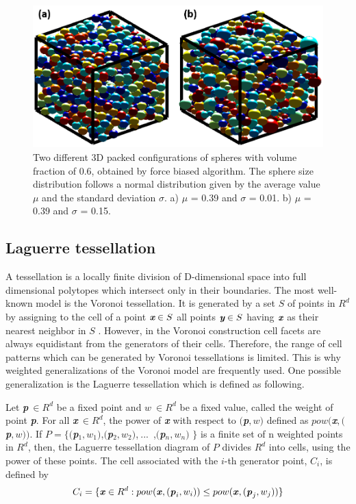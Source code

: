 \documentclass[review]{elsarticle}
\begin{document}
\begin{figure}[hb]
  \centering
  \includegraphics[scale=0.4]{PackedSpheres}
  \captionsetup{justification=centering}
  \caption[Close up of \textit{Hemidactylus} sp.]
   {Two different 3D packed configurations of spheres with volume fraction of 0.6, obtained by force biased algorithm. The sphere size distribution follows a normal distribution given by the average value $\mu$ and the standard deviation $\sigma$. a) $\mu$ = 0.39 and $\sigma$ = 0.01. b) $\mu$ = 0.39 and $\sigma$ = 0.15.}
   \label{fig:PackedSpheres}
\end{figure}

\subsection{Laguerre tessellation}
A tessellation is a locally finite division of D-dimensional space into full dimensional polytopes which intersect only in their boundaries. The most well-known model is the Voronoi tessellation. It is generated by a set $S$ of points in $R^d$ by assigning to the cell of a point $\textit{\textbf{x}}\in S$ all points $\textit{\textbf{y}}\in S$ having $\textit{\textbf{x}}$ as their nearest neighbor in $S$ \citep{Redenbach20091397}. However, in the Voronoi construction cell facets are always equidistant from the generators of their cells. Therefore, the range of cell patterns which can be generated by Voronoi tessellations is limited. This is why weighted generalizations of the Voronoi model are frequently used. One possible generalization is the Laguerre tessellation which is defined as following. 

Let \textbf{\textit{p}}$\ \in R^d$ be a fixed point and $w\ \in R^d$ be a fixed value, called the weight of point \textbf{\textit{p}}. For all \textbf{\textit{x}}$\ \in R^d$, the power of \textbf{\textit{x}} with respect to $($\textbf{\textit{p}}$,w)$ defined as $pow($\textbf{\textit{x}}$,($\textbf{\textit{p}}$,w))$. If $P=\lbrace ($\textbf{\textit{p}}$_1,w_1)$,$($\textbf{\textit{p}}$_2,w_2)$,$\ ...$\ ,$($\textbf{\textit{p}}$_n,w_n)$ $\rbrace$ is a finite set of n weighted points in $R^d$, then, the Laguerre tessellation diagram of $P$ divides $R^d$ into cells, using the power of these points. The cell associated with the $i$-th generator point, $C_i$, is defined by
\begin{equation}
C_i=\lbrace \textbf{\textit{x}}\in R^d:pow(\textbf{\textit{x}},(\textbf{\textit{p}}_i,w_i)) \leq
 pow(\textbf{\textit{x}},(\textbf{\textit{p}}_j,w_j))  \rbrace
\end{equation}
\end{document}
